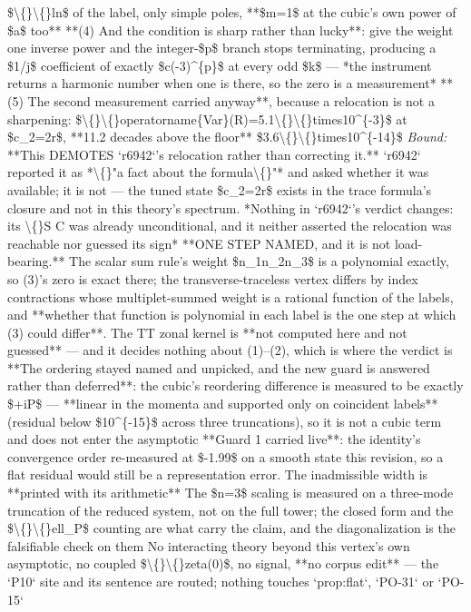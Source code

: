 \begin{description}
\$\textbackslash\{\}\textbackslash\{\}ln\$ of the label, only simple poles, **\$m=1\$ at the cubic's own power of \$a\$ too**  **(4) And the condition is sharp rather than lucky**: give the weight one inverse power and the integer-\$p\$ branch stops terminating, producing a \$1/j\$ coefficient of exactly \$c(-3)\textasciicircum{}\{p\}\$ at every odd \$k\$ --- *the instrument returns a harmonic number when one is there, so the zero is a measurement*  **(5) The second measurement carried anyway**, because a relocation is not a sharpening: \$\textbackslash\{\}\textbackslash\{\}operatorname\{Var\}(R)=5.1\textbackslash\{\}\textbackslash\{\}times10\textasciicircum{}\{-3\}\$ at \$c\_2=2r\$, **11.2 decades above the floor** \$3.6\textbackslash\{\}\textbackslash\{\}times10\textasciicircum{}\{-14\}\$
 \emph{Bound:}  **This DEMOTES `r6942`'s relocation rather than correcting it.** `r6942` reported it as *\textbackslash\{\}"a fact about the formula\textbackslash\{\}"* and asked whether it was available; it is not --- the tuned state \$c\_2=2r\$ exists in the trace formula's closure and not in this theory's spectrum. *Nothing in `r6942`'s verdict changes: its \textbackslash\{\}S C was already unconditional, and it neither asserted the relocation was reachable nor guessed its sign*  **ONE STEP NAMED, and it is not load-bearing.** The scalar sum rule's weight \$n\_1n\_2n\_3\$ is a polynomial exactly, so (3)'s zero is exact there; the transverse-traceless vertex differs by index contractions whose multiplet-summed weight is a rational function of the labels, and **whether that function is polynomial in each label is the one step at which (3) could differ**. The TT zonal kernel is **not computed here and not guessed** --- and it decides nothing about (1)--(2), which is where the verdict is  **The ordering stayed named and unpicked, and the new guard is answered rather than deferred**: the cubic's reordering difference is measured to be exactly \$+iP\$ --- **linear in the momenta and supported only on coincident labels** (residual below \$10\textasciicircum{}\{-15\}\$ across three truncations), so it is not a cubic term and does not enter the asymptotic  **Guard 1 carried live**: the identity's convergence order re-measured at \$-1.99\$ on a smooth state this revision, so a flat residual would still be a representation error. The inadmissible width is **printed with its arithmetic**  The \$n=3\$ scaling is measured on a three-mode truncation of the reduced system, not on the full tower; the closed form and the \$\textbackslash\{\}\textbackslash\{\}ell\_P\$ counting are what carry the claim, and the diagonalization is the falsifiable check on them  No interacting theory beyond this vertex's own asymptotic, no coupled \$\textbackslash\{\}\textbackslash\{\}zeta(0)\$, no signal, **no corpus edit** --- the `P10` site and its sentence are routed; nothing touches `prop:flat`, `PO-31` or `PO-15`

\end{description}
